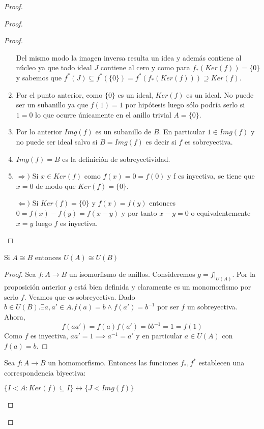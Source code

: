 \begin{proof}
\begin{proof}
\begin{proof}
\begin{enumerate}
	Del mismo modo la imagen inversa resulta un idea y además contiene al núcleo ya que todo ideal $J$ contiene al cero y como para $f_*(Ker(f)) = \{0\}$ y sabemos que $f^*(J) \subseteq f^*(\{0\}) = f^*(f_*(Ker(f))) \supseteq  Ker(f)$. 
	
	\item Por el punto anterior, como $\{0\}$ es un ideal, $Ker(f)$ es un ideal. No puede ser un subanillo ya que $f(1) = 1$ por hipótesis luego sólo podría serlo si $1 = 0$ lo que ocurre únicamente en el anillo trivial $A = \{0\}$. 
	
	\item Por lo anterior $Img(f)$ es un subanillo de $B$. En particular $1 \in Img(f)$ y no puede ser ideal salvo si $B = Img(f)$ es decir si $f$ es sobreyectiva. 
	
	\item $Img(f) = B$ es la definición de sobreyectividad. 
		
	\item  $\Rightarrow)$ Si $x \in Ker(f)$ como $f(x) = 0 = f(0)$ y f es inyectiva, se tiene que $x = 0$ de modo que $Ker(f) = \{0\}$. 
		
	$\Leftarrow)$ Si $Ker(f) = \{0\}$ y $f(x) = f(y)$ entonces $0 = f(x) - f(y) = f(x-y)$ y por tanto $x-y = 0$ o equivalentemente $x = y$ luego $f$ es inyectiva. 
	\end{enumerate}
\end{proof}

\begin{proposition}
	Si $A \cong B$ entonces $U(A) \cong U(B)$
\end{proposition}
\begin{proof}
	Sea $f:A \to B$ un isomorfismo de anillos. Consideremos $g = f|_{U(A)}$. Por la proposición anterior $g$ está bien definida y claramente es un monomorfismo por serlo $f$. Veamos que es sobreyectiva. Dado $b \in U(B). \exists a,a' \in A. f(a) = b \land f(a') = b^{-1}$ por ser $f$ un sobreyectiva. Ahora, $$f(aa') = f(a)f(a') = bb^{-1} = 1 = f(1)$$ Como $f$ es inyectiva, $aa' = 1 \implies a^{-1} = a'$ y en particular $a \in U(A)$ con $f(a) = b$.  
\end{proof}

\begin{proposition}
Sea $f:A \to B$ un homomorfismo. Entonces las funciones $f_*,f^*$ establecen una correspondencia biyectiva:

$\{I < A:Ker(f) \subseteq I\} \leftrightarrow \{J < Img(f)\}$


\end{proposition}
\end{proof}
\end{proof}

